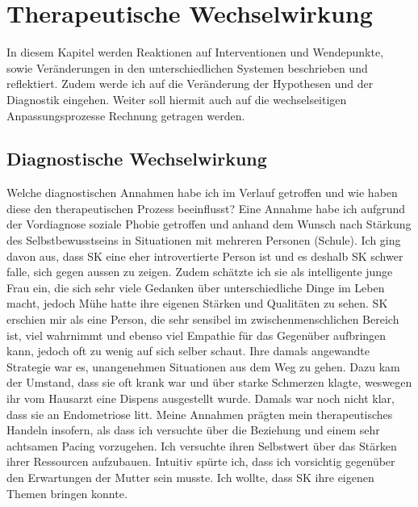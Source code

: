 \section{Therapeutische Wechselwirkung} \label{sec:TherapeutischeWechselwirkung}
In diesem Kapitel werden Reaktionen auf Interventionen und Wendepunkte, sowie Veränderungen in den unterschiedlichen Systemen beschrieben und reflektiert. Zudem werde ich auf die Veränderung der Hypothesen und der Diagnostik eingehen. Weiter soll hiermit auch auf die wechselseitigen Anpassungsprozesse Rechnung getragen werden. 

\subsection{Diagnostische Wechselwirkung} \label{sc:diagnostischeWechselwirkung}
Welche diagnostischen Annahmen habe ich im Verlauf getroffen und wie haben diese den therapeutischen Prozess beeinflusst? Eine Annahme habe ich aufgrund der Vordiagnose soziale Phobie getroffen und anhand dem Wunsch nach Stärkung des Selbstbewusstseins in Situationen mit mehreren Personen (Schule). Ich ging davon aus, dass SK eine eher introvertierte Person ist und es deshalb SK schwer falle, sich gegen aussen zu zeigen. Zudem schätzte ich sie als intelligente junge Frau ein, die sich sehr viele Gedanken über unterschiedliche Dinge im Leben macht, jedoch Mühe hatte ihre eigenen Stärken und Qualitäten zu sehen. SK erschien mir als eine Person, die sehr sensibel im zwischenmenschlichen Bereich ist, viel wahrnimmt und ebenso viel Empathie für das Gegenüber aufbringen kann, jedoch oft zu wenig auf sich selber schaut. Ihre damals angewandte Strategie war es, unangenehmen Situationen aus dem Weg zu gehen. Dazu kam der Umstand, dass sie oft krank war und über starke Schmerzen klagte, weswegen ihr vom Hausarzt eine Dispens ausgestellt wurde. Damals war noch nicht klar, dass sie an Endometriose litt. Meine Annahmen prägten mein therapeutisches Handeln insofern, als dass ich versuchte über die Beziehung und einem sehr achtsamen Pacing vorzugehen. Ich versuchte ihren Selbstwert über das Stärken ihrer Ressourcen aufzubauen.  Intuitiv spürte ich, dass ich vorsichtig gegenüber den Erwartungen der Mutter sein musste. Ich wollte, dass SK ihre eigenen Themen bringen konnte. 

